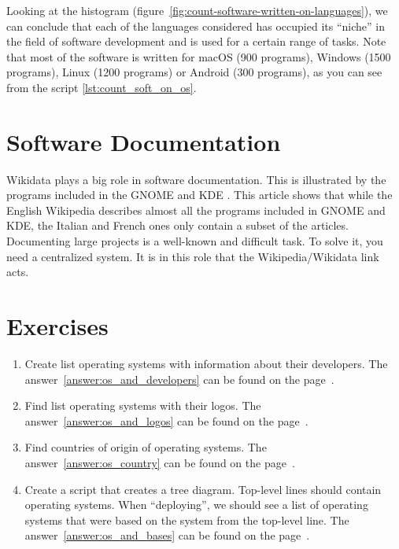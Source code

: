 Looking at the histogram (figure~\ref{fig:count-software-written-on-languages}), we can conclude that each of the languages considered has occupied its ``niche'' in the field of software development and is used for a certain range of tasks. Note that most of the software is written for macOS (900 programs), Windows (1500 programs), Linux (1200 programs) or Android (300 programs), as you can see from the script \ref{lst:count_soft_on_os}.

\section{Software Documentation}
Wikidata plays a big role in software documentation. This is illustrated by the programs included in the GNOME and KDE \cite{Samuel2020DocumentingWiki}. This article shows that while the English Wikipedia describes almost all the programs included in GNOME and KDE, the Italian and French ones only contain a subset of the articles. Documenting large projects is a well-known and difficult task. To solve it, you need a centralized system. It is in this role that the Wikipedia/Wikidata link acts\cite{Samuel2020DocumentingWiki}.

\section{Exercises}
\label{tasks:operating_system_tasks}
\begin{enumerate}
	\item Create list operating systems with information about their developers. The answer~\ref{answer:os_and_developers} can be found on the page~\pageref{answer:os_and_developers}.
	\item Find list operating systems with their logos. The answer~\ref{answer:os_and_logos} can be found on the page~\pageref{answer:os_and_logos}.
	\item Find countries of origin of operating systems. The answer~\ref{answer:os_country} can be found on the page~\pageref{answer:os_country}.
	\item Create a script that creates a tree diagram. Top-level lines should contain operating systems. When ``deploying'', we should see a list of operating systems that were based on the system from the top-level line. The answer~\ref{answer:os_and_bases} can be found on the page~\pageref{answer:os_and_bases}.
\end{enumerate}

